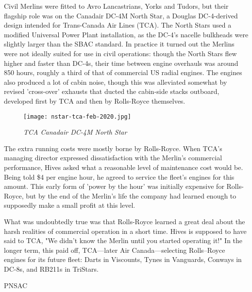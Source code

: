 Civil Merlins were fitted to Avro Lancastrians, Yorks and Tudors, but
their flagship role was on the Canadair DC-4M North Star, a Douglas
DC-4-derived design intended for Trans-Canada Air Lines (TCA). The
North Stars used a modified Universal Power Plant installation, as the
DC-4's nacelle bulkheads were slightly larger than the SBAC standard.
In practice it turned out the Merlins were not ideally suited for use
in civil operations: though the North Stars flew higher and faster than
DC-4s, their time between engine overhauls was around 850 hours,
roughly a third of that of commercial US radial engines. The engines
also produced a lot of cabin noise, though this was alleviated somewhat
by revised 'cross-over' exhausts that ducted the cabin-side stacks
outboard, developed first by TCA and then by Rolls-Royce themselves.

\begin{figure}[httb]
   \vspace{2em}
   \centering
   \texttt{[image: nstar-tca-feb-2020.jpg]}
   \caption*{\small \em TCA Canadair DC-4M North Star}
   \label{fig:wall-two}
\end{figure}

The extra running costs were mostly borne by Rolls-Royce. When TCA's
managing director expressed dissatisfaction with the Merlin's
commercial performance, Hives asked what a reasonable level of
maintenance cost would be. Being told \$4 per engine hour, he agreed to
service the fleet's engines for this amount. This early form of 'power
by the hour' was initially expensive for Rolls-Royce, but by the end of
the Merlin's life the company had learned enough to supposedly make a
small profit at this level.

What was undoubtedly true was that Rolls-Royce learned a great deal
about the harsh realities of commercial operation in a short time.
Hives is supposed to have said to TCA, "We didn't know the Merlin until
you started operating it!" In the longer term, this paid off,
TCA---later Air Canada---selecting Rolls--Royce engines for its future
fleet: Darts in Viscounts, Tynes in Vanguards, Conways in DC-8s, and
RB211s in TriStars.


\begin{footnotesize} \raggedleft PNSAC\\
\end{footnotesize}



